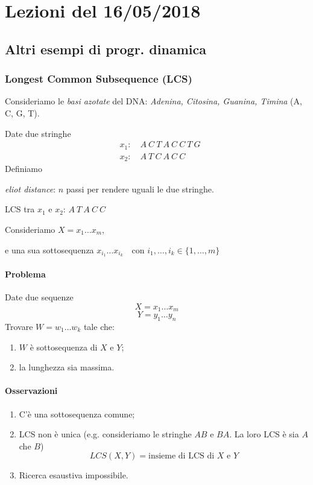 \section{Lezioni del 16/05/2018}

\subsection{Altri esempi di progr. dinamica}

\subsubsection{Longest Common Subsequence (LCS)}

Consideriamo le \emph{basi azotate} del DNA: \textit{Adenina, Citosina, Guanina, Timina} (A, C, G, T).

Date due stringhe 
\begin{align*}
    & x_1: \quad A \ C \ T \ A \ C \ C \ T \ G \\
    & x_2: \quad A \ T \ C \ A \ C \ C
\end{align*}
Definiamo \par
\emph{eliot distance}: $n$ passi per rendere uguali le due stringhe.
\bigskip

LCS tra $x_1$ e $x_2$: $A\ T\ A\ C\ C$

\bigskip

Consideriamo $X = x_1 \ldots x_m$, \par
e una sua sottosequenza $x_{i_1}\ldots x_{i_k} \quad \text{con } i_1,\ldots, i_k \in \{ 1,\ldots, m \}$

\paragraph{Problema} Date due sequenze
$$X = x_1 \ldots x_m$$
$$Y = y_1 \ldots y_n$$
Trovare $W = w_1 \ldots w_k$ tale che:
\begin{enumerate}
    \item $W$ è sottosequenza di $X$ e $Y$;
    \item la lunghezza sia massima.
\end{enumerate}

\paragraph{Osservazioni}
\begin{enumerate}
    \item C'è una sottosequenza comune;
    \item LCS non è unica (e.g. consideriamo le stringhe $AB$ e $BA$. La loro LCS è sia $A$ che $B$)
    $$LCS(X,Y) = \text{insieme di LCS di $X$ e $Y$}$$
    \item Ricerca esaustiva impossibile.
\end{enumerate}

